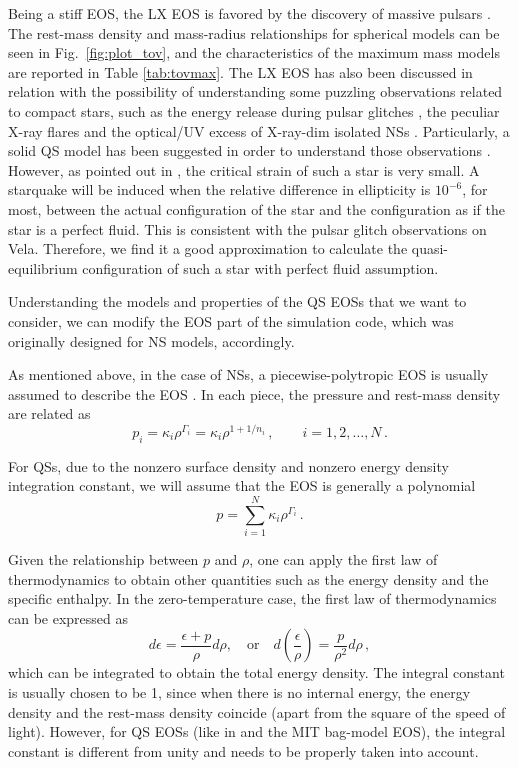 \documentclass[twocolumn,superscriptaddress,showpacs,prd,aps,amsmath,amssymb,nofootinbib]{revtex4-1}
\begin{document}
Being a stiff EOS, the LX EOS is favored by the discovery of massive
pulsars \cite{lai2011, Demorest2010,Antoniadis2013}. The rest-mass
density and mass-radius relationships for spherical models can be seen in
Fig.~\ref{fig:plot_tov}, and the characteristics of the maximum mass
models are reported in Table \ref{tab:tovmax}. The LX EOS has also been
discussed in relation with the possibility of understanding some puzzling
observations related to compact stars, such as the energy release during
pulsar glitches \cite{zhou2014}, the peculiar X-ray flares \cite{xu2009}
and the optical/UV excess of X-ray-dim isolated NSs
\cite{wang2017}. Particularly, a solid QS model has been suggested in
order to understand those observations \cite{Xu2003}. However, as pointed
out in \cite{zhou2014}, the critical strain of such a star is very
small. A starquake will be induced when the relative difference in
ellipticity is $10^{-6}$, for most, between the actual configuration of
the star and the configuration as if the star is a perfect fluid. This is
consistent with the pulsar glitch observations on Vela. Therefore, we
find it a good approximation to calculate the quasi-equilibrium
configuration of such a star with perfect fluid assumption.

Understanding the models and properties of the QS EOSs that we want to
consider, we can modify the EOS part of the simulation code, which was
originally designed for NS models, accordingly. 

As mentioned above, in the case of NSs, a piecewise-polytropic EOS is
usually assumed to describe the EOS \cite{Read:2009a,
  Rezzolla_book:2013}. In each piece, the pressure and rest-mass density
are related as
%
\begin{equation}
p_i = \kappa_i \rho^{\Gamma_i}= \kappa_i \rho^{1+1/n_i}\,, 
\qquad   i=1,2,\ldots,N\,.
\label{eq:polyEOS}
\end{equation}

For QSs, due to the nonzero surface density and nonzero energy density
integration constant, we will assume that the EOS is generally a
polynomial
\begin{equation}
p = \sum\limits_{i=1}^{N}\kappa_i \rho^{\Gamma_i}\,.   
\label{eq:qsEOS}
\end{equation}

Given the relationship between $p$ and $\rho$, one can apply the first
law of thermodynamics to obtain other quantities such as the energy
density and the specific enthalpy. In the zero-temperature case, the
first law of thermodynamics can be expressed as \cite{Rezzolla_book:2013}
\begin{equation}
d\epsilon =\frac{\epsilon+p}{\rho} d\rho, \quad\mbox{or}\quad 
d\left(\frac{\epsilon}{\rho}\right)=\frac{p}{\rho^2}d\rho\,,
\label{eq:1stlaw}
\end{equation}
which can be integrated to obtain the total energy density. The integral
constant is usually chosen to be 1, since when there is no internal
energy, the energy density and the rest-mass density coincide (apart from
the square of the speed of light). However, for QS EOSs
(like in \cite{Guo2014} and the MIT bag-model EOS), the integral constant
is different from unity and needs to be properly taken into account.
\end{document}
